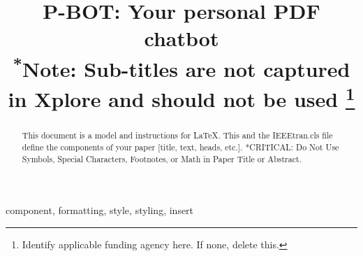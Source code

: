 \documentclass[conference]{IEEEtran}
\begin{document}
\title{P-BOT: Your personal PDF chatbot\\
{\footnotesize \textsuperscript{*}Note: Sub-titles are not captured in Xplore and
should not be used}
\thanks{Identify applicable funding agency here. If none, delete this.}
}

\author{
\and
{}
\and
{}
\and
{}
}

\maketitle

\begin{abstract}
This document is a model and instructions for \LaTeX.
This and the IEEEtran.cls file define the components of your paper [title, text, heads, etc.]. *CRITICAL: Do Not Use Symbols, Special Characters, Footnotes, 
or Math in Paper Title or Abstract.
\end{abstract}

\begin{IEEEkeywords}
component, formatting, style, styling, insert
\end{IEEEkeywords}
\end{document}
